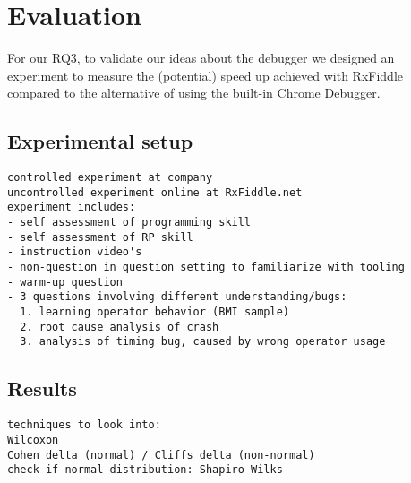 \section{Evaluation}
For our RQ3, to validate our ideas about the debugger we designed an experiment to measure the (potential) speed up achieved with RxFiddle compared to the alternative of using the built-in Chrome Debugger.

\subsection{Experimental setup}

{\color{red}
\begin{verbatim}
controlled experiment at company
uncontrolled experiment online at RxFiddle.net
experiment includes:
- self assessment of programming skill
- self assessment of RP skill
- instruction video's
- non-question in question setting to familiarize with tooling
- warm-up question
- 3 questions involving different understanding/bugs:
  1. learning operator behavior (BMI sample)
  2. root cause analysis of crash
  3. analysis of timing bug, caused by wrong operator usage
\end{verbatim}
}

\subsection{Results}

{\color{red}
\begin{verbatim}
techniques to look into:
Wilcoxon
Cohen delta (normal) / Cliffs delta (non-normal)
check if normal distribution: Shapiro Wilks
\end{verbatim}
}
